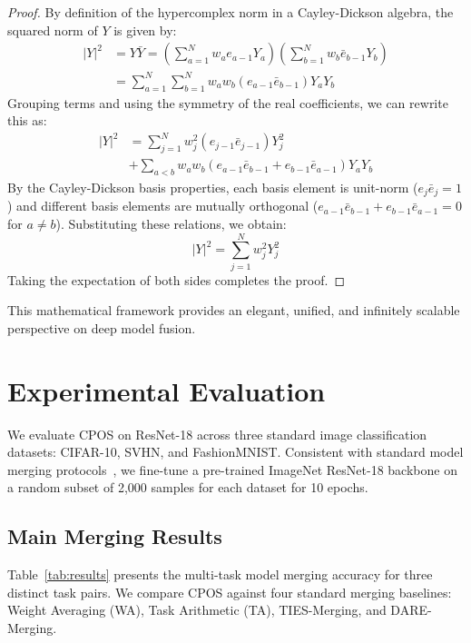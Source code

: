 \documentclass{article}
\theoremstyle{plain}
\theoremstyle{definition}
\theoremstyle{remark}
\begin{document}
\begin{proof}
By definition of the hypercomplex norm in a Cayley-Dickson algebra, the squared norm of $Y$ is given by:
\begin{align}
|Y|^2 &= Y \bar{Y} = \left(\sum_{a=1}^N w_a e_{a-1} Y_a\right) \left(\sum_{b=1}^N w_b \bar{e}_{b-1} Y_b\right) \\
&= \sum_{a=1}^N \sum_{b=1}^N w_a w_b (e_{a-1} \bar{e}_{b-1}) Y_a Y_b
\end{align}
Grouping terms and using the symmetry of the real coefficients, we can rewrite this as:
\begin{align}
|Y|^2 &= \sum_{j=1}^N w_j^2 (e_{j-1} \bar{e}_{j-1}) Y_j^2 \nonumber \\
&+ \sum_{a < b} w_a w_b (e_{a-1} \bar{e}_{b-1} + e_{b-1} \bar{e}_{a-1}) Y_a Y_b
\end{align}
By the Cayley-Dickson basis properties, each basis element is unit-norm ($e_j \bar{e}_j = 1$) and different basis elements are mutually orthogonal ($e_{a-1} \bar{e}_{b-1} + e_{b-1} \bar{e}_{a-1} = 0$ for $a \neq b$). Substituting these relations, we obtain:
\begin{equation}
|Y|^2 = \sum_{j=1}^N w_j^2 Y_j^2
\end{equation}
Taking the expectation of both sides completes the proof.
\end{proof}

This mathematical framework provides an elegant, unified, and infinitely scalable perspective on deep model fusion.

\section{Experimental Evaluation}
\label{sec:experiments}

We evaluate CPOS on ResNet-18 across three standard image classification datasets: CIFAR-10, SVHN, and FashionMNIST. Consistent with standard model merging protocols~\cite{tcac2025}, we fine-tune a pre-trained ImageNet ResNet-18 backbone on a random subset of 2,000 samples for each dataset for 10 epochs.

\subsection{Main Merging Results}
Table~\ref{tab:results} presents the multi-task model merging accuracy for three distinct task pairs. We compare CPOS against four standard merging baselines: Weight Averaging (WA), Task Arithmetic (TA), TIES-Merging, and DARE-Merging.
\end{document}
